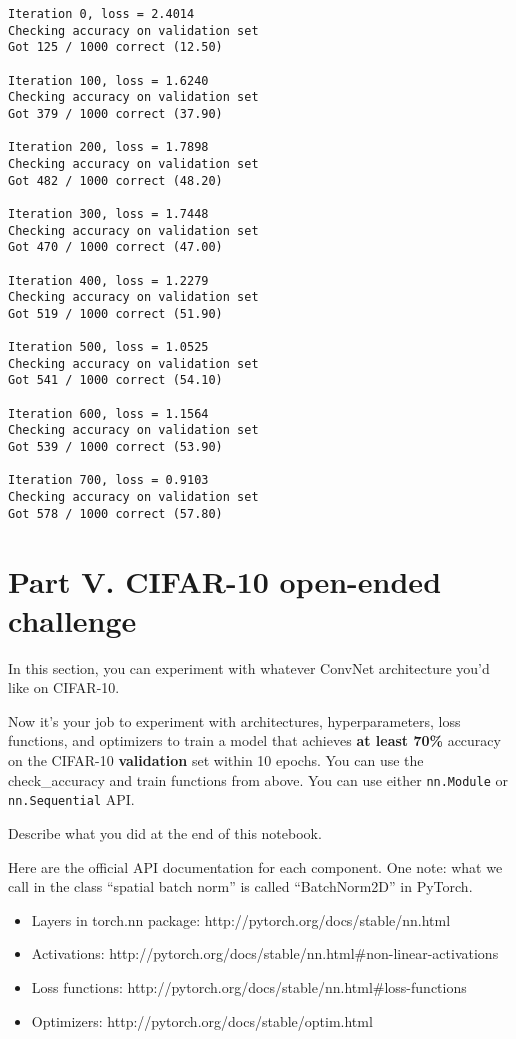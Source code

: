 \documentclass[11pt]{article}
\providecommand{\tightlist}{%
      \setlength{\itemsep}{0pt}\setlength{\parskip}{0pt}}
\begin{document}
    \begin{Verbatim}[commandchars=\\\{\}]
Iteration 0, loss = 2.4014
Checking accuracy on validation set
Got 125 / 1000 correct (12.50)

Iteration 100, loss = 1.6240
Checking accuracy on validation set
Got 379 / 1000 correct (37.90)

Iteration 200, loss = 1.7898
Checking accuracy on validation set
Got 482 / 1000 correct (48.20)

Iteration 300, loss = 1.7448
Checking accuracy on validation set
Got 470 / 1000 correct (47.00)

Iteration 400, loss = 1.2279
Checking accuracy on validation set
Got 519 / 1000 correct (51.90)

Iteration 500, loss = 1.0525
Checking accuracy on validation set
Got 541 / 1000 correct (54.10)

Iteration 600, loss = 1.1564
Checking accuracy on validation set
Got 539 / 1000 correct (53.90)

Iteration 700, loss = 0.9103
Checking accuracy on validation set
Got 578 / 1000 correct (57.80)

    \end{Verbatim}

    \hypertarget{part-v.-cifar-10-open-ended-challenge}{%
\section{Part V. CIFAR-10 open-ended
challenge}\label{part-v.-cifar-10-open-ended-challenge}}

In this section, you can experiment with whatever ConvNet architecture
you'd like on CIFAR-10.

Now it's your job to experiment with architectures, hyperparameters,
loss functions, and optimizers to train a model that achieves \textbf{at
least 70\%} accuracy on the CIFAR-10 \textbf{validation} set within 10
epochs. You can use the check\_accuracy and train functions from above.
You can use either \texttt{nn.Module} or \texttt{nn.Sequential} API.

Describe what you did at the end of this notebook.

Here are the official API documentation for each component. One note:
what we call in the class ``spatial batch norm'' is called
``BatchNorm2D'' in PyTorch.

\begin{itemize}
\tightlist
\item
  Layers in torch.nn package: http://pytorch.org/docs/stable/nn.html
\item
  Activations:
  http://pytorch.org/docs/stable/nn.html\#non-linear-activations
\item
  Loss functions: http://pytorch.org/docs/stable/nn.html\#loss-functions
\item
  Optimizers: http://pytorch.org/docs/stable/optim.html
\end{itemize}
\end{document}
